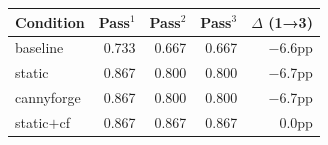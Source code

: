 \begin{tabular}{lrrrr}
\toprule
Condition & Pass$^1$ & Pass$^2$ & Pass$^3$ & $\Delta$ (1→3) \\
\midrule
baseline  & 0.733 & 0.667 & 0.667 & $-$6.6pp \\
static    & 0.867 & 0.800 & 0.800 & $-$6.7pp \\
cannyforge & 0.867 & 0.800 & 0.800 & $-$6.7pp \\
static$+$cf & 0.867 & 0.867 & 0.867 & 0.0pp \\
\bottomrule
\end{tabular}
